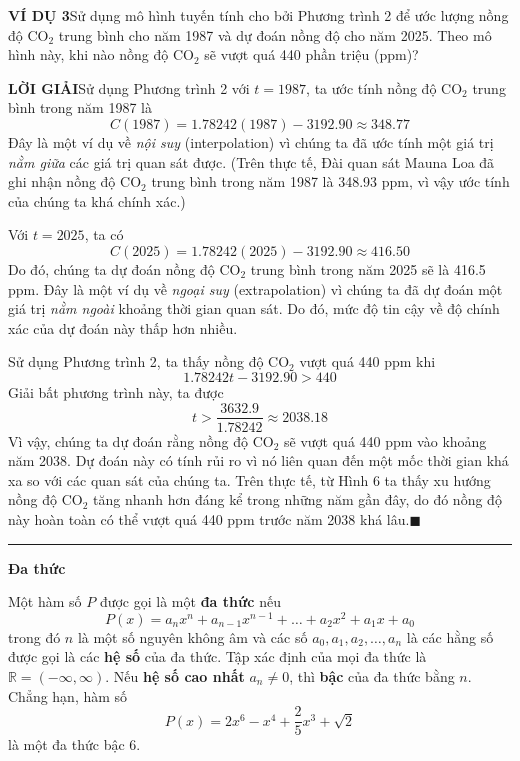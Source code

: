 \begin{minipage}[t]{0.708\textwidth}
    \fontsize{8.8pt}{11.5pt}\selectfont
    \noindent
    \textbf{\textsf{\color{stewartcyan}VÍ DỤ 3}}\quad Sử dụng mô hình tuyến tính cho bởi Phương trình 2 để ước lượng nồng độ $\text{CO}_2$ trung bình cho năm 1987 và dự đoán nồng độ cho năm 2025. Theo mô hình này, khi nào nồng độ $\text{CO}_2$ sẽ vượt quá 440 phần triệu (ppm)?

    \vspace{0.2cm}
    \noindent
    \textbf{\textsf{\color{stewartcyan}LỜI GIẢI}}\quad Sử dụng Phương trình 2 với $t = 1987$, ta ước tính nồng độ $\text{CO}_2$ trung bình trong năm 1987 là
    \[
    C(1987) = 1.78242(1987) - 3192.90 \approx 348.77
    \]
    Đây là một ví dụ về \emph{nội suy} (interpolation) vì chúng ta đã ước tính một giá trị \emph{nằm giữa} các giá trị quan sát được. (Trên thực tế, Đài quan sát Mauna Loa đã ghi nhận nồng độ $\text{CO}_2$ trung bình trong năm 1987 là 348.93 ppm, vì vậy ước tính của chúng ta khá chính xác.)

    Với $t = 2025$, ta có
    \[
    C(2025) = 1.78242(2025) - 3192.90 \approx 416.50
    \]
    Do đó, chúng ta dự đoán nồng độ $\text{CO}_2$ trung bình trong năm 2025 sẽ là 416.5 ppm. Đây là một ví dụ về \emph{ngoại suy} (extrapolation) vì chúng ta đã dự đoán một giá trị \emph{nằm ngoài} khoảng thời gian quan sát. Do đó, mức độ tin cậy về độ chính xác của dự đoán này thấp hơn nhiều.

    Sử dụng Phương trình 2, ta thấy nồng độ $\text{CO}_2$ vượt quá 440 ppm khi
    \[
    1.78242t - 3192.90 > 440
    \]
    Giải bất phương trình này, ta được
    \[
    t > \frac{3632.9}{1.78242} \approx 2038.18
    \]
    Vì vậy, chúng ta dự đoán rằng nồng độ $\text{CO}_2$ sẽ vượt quá 440 ppm vào khoảng năm 2038. Dự đoán này có tính rủi ro vì nó liên quan đến một mốc thời gian khá xa so với các quan sát của chúng ta. Trên thực tế, từ Hình 6 ta thấy xu hướng nồng độ $\text{CO}_2$ tăng nhanh hơn đáng kể trong những năm gần đây, do đó nồng độ này hoàn toàn có thể vượt quá 440 ppm trước năm 2038 khá lâu.\hfill{\color{stewartcyan}$\blacksquare$}

    \vspace{0.4cm}
    \noindent
    {\color{stewartcyan}\rule{1.2ex}{1.2ex}}\hspace{0.5em}\textbf{\large\textsf{Đa thức}}

    \vspace{0.15cm}
    \noindent
    Một hàm số $P$ được gọi là một \textbf{đa thức} nếu
    \[
    P(x) = a_n x^n + a_{n-1} x^{n-1} + \dots + a_2 x^2 + a_1 x + a_0
    \]
    trong đó $n$ là một số nguyên không âm và các số $a_0, a_1, a_2, \dots, a_n$ là các hằng số được gọi là các \textbf{hệ số} của đa thức. Tập xác định của mọi đa thức là $\mathbb{R} = (-\infty, \infty)$. Nếu \textbf{hệ số cao nhất} $a_n \neq 0$, thì \textbf{bậc} của đa thức bằng $n$. Chẳng hạn, hàm số
    \[
    P(x) = 2x^6 - x^4 + \frac{2}{5}x^3 + \sqrt{2}
    \]
    là một đa thức bậc 6.


\end{minipage}
